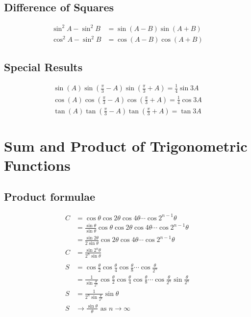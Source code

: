 \documentclass[12pt]{article}
\newcommand{\pwidth}{0.46\linewidth}
\begin{document}
\begin{minipage}[t]{\pwidth}
		\subsection{Difference of Squares}
		\begin{align}
			\sin^2A - \sin^2B &= \sin(A-B)\sin(A+B) \\
			\cos^2A - \sin^2B &= \cos(A-B)\cos(A+B)
		\end{align}

		\subsection{Special Results}
		\begin{align}
			\sin(A)\sin\left(\frac{\pi}{3} - A\right)\sin\left(\frac{\pi}{3} + A\right) = \frac 14 \sin 3A \\
			\cos(A)\cos\left(\frac{\pi}{3} - A\right)\cos\left(\frac{\pi}{3} + A\right) = \frac 14 \cos 3A \\
			\tan(A)\tan\left(\frac{\pi}{3} - A\right)\tan\left(\frac{\pi}{3} + A\right) = \tan 3A
		\end{align}
	\end{minipage}

	\section{Sum and Product of Trigonometric Functions}
	\subsection{Product formulae}
	\begin{align}
		C &= \cos \theta \cos 2\theta \cos 4\theta \cdots \cos 2^{n-1}\theta \nonumber \\
		  &= \frac{\sin\theta}{\sin\theta}\cos \theta \cos 2\theta \cos 4\theta \cdots \cos 2^{n-1}\theta \nonumber \\
		  &= \frac{\sin 2\theta}{2 \sin\theta}\cos 2\theta \cos 4\theta \cdots \cos 2^{n-1}\theta \nonumber \\
		C &= \frac{\sin 2^n\theta}{2^n \sin\theta} \\
		\nonumber \\
		S &= \cos\frac{\theta}{2} \cos\frac{\theta}{4} \cos\frac{\theta}{8} \cdots \cos\frac{\theta}{2^n} \nonumber \\
		  &= \frac{1}{\sin\frac{\theta}{2^n}} \cos\frac{\theta}{2} \cos\frac{\theta}{4} \cos\frac{\theta}{8} \cdots \cos\frac{\theta}{2^n} \sin\frac{\theta}{2^n} \nonumber \\
		S &= \frac{1}{2^n\sin\frac{\theta}{2^n}} \sin\theta \\
		S &\to \frac{\sin\theta}{\theta} \text{ as } n \to \infty
	\end{align}
\end{document}
